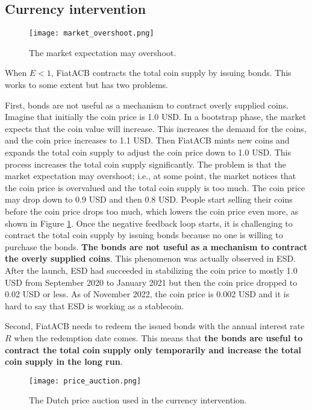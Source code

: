 \documentclass[dvipdfmx,a4paper]{article}
\begin{document}
\subsection{Currency intervention}
\label{section_overshoot}

\begin{figure}[tb]
\centering
\texttt{[image: market\_overshoot.png]}
\caption{The market expectation may overshoot.}
\label{market_overshoot}
\end{figure}

When $E<1$, FiatACB contracts the total coin supply by issuing bonds. This works to some extent but has two problems.

First, bonds are not useful as a mechanism to contract overly supplied coins. Imagine that initially the coin price is 1.0 USD. In a bootstrap phase, the market expects that the coin value will increase. This increases the demand for the coins, and the coin price increases to 1.1 USD. Then FiatACB mints new coins and expands the total coin supply to adjust the coin price down to 1.0 USD. This process increases the total coin supply significantly. The problem is that the market expectation may overshoot; i.e., at some point, the market notices that the coin price is overvalued and the total coin supply is too much. The coin price may drop down to 0.9 USD and then 0.8 USD. People start selling their coins before the coin price drops too much, which lowers the coin price even more, as shown in Figure \ref{market_overshoot}. Once the negative feedback loop starts, it is challenging to contract the total coin supply by issuing bonds because no one is willing to purchase the bonds. \textbf{The bonds are not useful as a mechanism to contract the overly supplied coins}. This phenomenon was actually observed in ESD. After the launch, ESD had succeeded in stabilizing the coin price to mostly 1.0 USD from September 2020 to January 2021 but then the coin price dropped to 0.02 USD or less. As of November 2022, the coin price is 0.002 USD and it is hard to say that ESD is working as a stablecoin.

Second, FiatACB needs to redeem the issued bonds with the annual interest rate $R$ when the redemption date comes. This means that \textbf{the bonds are useful to contract the total coin supply only temporarily and increase the total coin supply in the long run}.

\begin{figure}[tb]
\centering
\texttt{[image: price\_auction.png]}
\caption{The Dutch price auction used in the currency intervention.}
\label{price_auction}
\end{figure}
\end{document}
